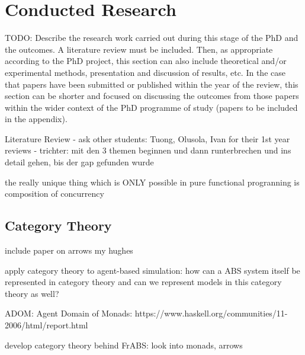 \section{Conducted Research}
TODO: Describe the research work carried out during this stage of the PhD and the outcomes. A literature review must be included. Then, as appropriate according to the PhD project, this section can also include theoretical and/or experimental methods, presentation and discussion of results, etc. In the case that papers have been submitted or published within the year of the review, this section can be shorter and focused on discussing the outcomes from those papers within the wider context of the PhD programme of study (papers to be included in the appendix).

Literature Review
- ask other students: Tuong, Olusola, Ivan for their 1st year reviews
- trichter: mit den 3 themen beginnen und dann runterbrechen und ins detail gehen, bis der gap gefunden wurde


the really unique thing which is ONLY possible in pure functional progranning is composition of concurrency
 

\subsection{Category Theory}
include paper on arrows my hughes

apply category theory to agent-based simulation: how can a ABS system itself be represented in category theory and can we represent models in this category theory as well?

ADOM: Agent Domain of Monads: https://www.haskell.org/communities/11-2006/html/report.html

 develop category theory behind FrABS: look into monads, arrows
 

